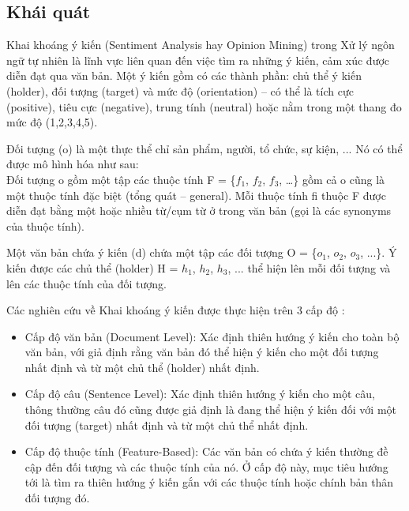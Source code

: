 \documentclass[12pt]{report}
\begin{document}
			\subsection*{Khái quát}
				\par Khai khoáng ý kiến (Sentiment Analysis hay Opinion Mining) trong Xử lý ngôn ngữ tự nhiên là lĩnh vực liên quan đến việc tìm ra những ý kiến, cảm xúc được diễn đạt qua văn bản. Một ý kiến gồm có các thành phần: chủ thể ý kiến (holder), đối tượng (target) và mức độ (orientation) – có thể là tích cực (positive), tiêu cực (negative), trung tính (neutral) hoặc nằm trong một thang đo mức độ (1,2,3,4,5).
				\par Đối tượng (o) là một thực thể chỉ sản phẩm, người, tổ chức, sự kiện, ... Nó có thể được mô hình hóa như sau:\\				
				Đối tượng o gồm một tập các thuộc tính F = \{$f_1$, $f_2$, $f_3$, …\} gồm cả o cũng là một thuộc tính đặc biệt (tổng quát – general). Mỗi thuộc tính fi thuộc F được diễn đạt bằng một hoặc nhiều từ/cụm từ ở trong văn bản (gọi là các synonyms của thuộc tính).
				\par Một văn bản chứa ý kiến (d) chứa một tập các đối tượng O = \{$o_1$, $o_2$, $o_3$, ...\}. Ý kiến được các chủ thể (holder) H = {$h_1$, $h_2$, $h_3$, ...} thể hiện lên mỗi đối tượng và lên các thuộc tính của đối tượng. 
				\par Các nghiên cứu về Khai khoáng ý kiến được thực hiện trên 3 cấp độ \cite{sentiment}:
				\begin{itemize}
					\item{Cấp độ văn bản (Document Level): Xác định thiên hướng ý kiến cho toàn bộ văn bản, với giả định rằng văn bản đó thể hiện ý kiến cho một đối tượng nhất định và từ một chủ thể (holder) nhất định.}		
					\item{Cấp độ câu (Sentence Level): Xác định thiên hướng ý kiến cho một câu, thông thường câu đó cũng được giả định là đang thể hiện ý kiến đối với một đối tượng (target) nhất định và từ một chủ thể nhất định.}
					\item{Cấp độ thuộc tính (Feature-Based): Các văn bản có chứa ý kiến thường đề cập đến đối tượng và các thuộc tính của nó. Ở cấp độ này, mục tiêu hướng tới là tìm ra thiên hướng ý kiến gắn với các thuộc tính hoặc chính bản thân đối tượng đó.}
				\end{itemize}				
\end{document}
